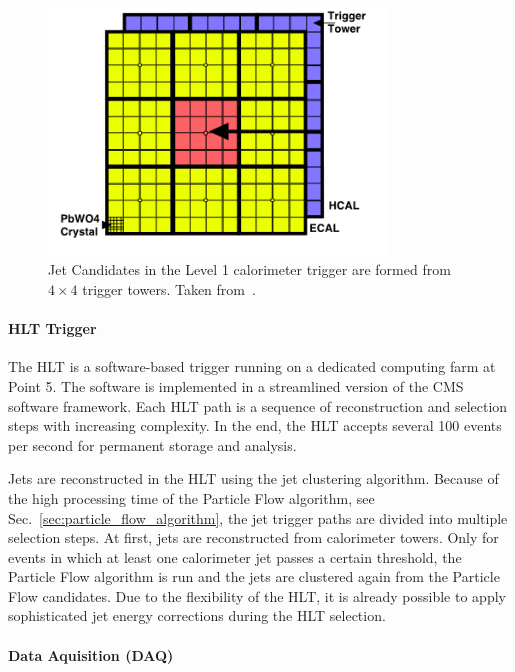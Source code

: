 \begin{figure}[htp]
    \centering
    \includegraphics[width=0.8\textwidth]{figures/cms_detector/l1_calo_towers.png}\hfill
    \caption[Jet Candidates in the Level 1 calorimeter trigger]{Jet Candidates
        in the Level 1 calorimeter trigger are formed from $4\times4$ trigger
        towers. Taken from~\cite{Rose:2009zz}.}
    \label{fig:cms:l1_calo_towers}
\end{figure}

\paragraph{HLT Trigger} 
The HLT is a software-based trigger running on a dedicated computing farm at
Point 5. The software is implemented in a streamlined version of the CMS
software framework. Each HLT path is a sequence of reconstruction and
selection steps with increasing complexity. In the end, the HLT accepts several
100 events per second for permanent storage and analysis.

Jets are reconstructed in the HLT using the \antikt jet clustering algorithm. Because of the
high processing time of the Particle Flow algorithm, see
Sec.~\ref{sec:particle_flow_algorithm}, the jet trigger paths are divided into
multiple selection steps. At first, jets are reconstructed from calorimeter
towers.  Only for events in which at least one calorimeter jet passes a certain
\pt threshold, the Particle Flow algorithm is run and the jets are clustered
again from the Particle Flow candidates. Due to the flexibility of the HLT, it
is already possible to apply sophisticated jet energy corrections during the HLT
 selection.

\paragraph{Data Aquisition (DAQ)}

